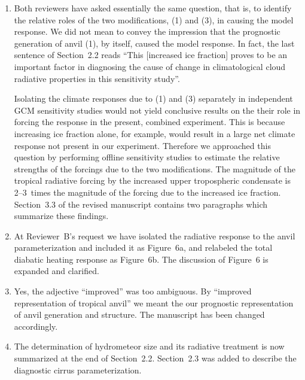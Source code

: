 \documentclass[12pt,twoside]{article}
\begin{document}
\begin{enumerate}

\item Both reviewers have asked essentially the same question, that
is, to identify the relative roles of the two modifications, (1) and
(3), in causing the model response.
We did not mean to convey the impression that the prognostic
generation of anvil (1), by itself, caused the model response.
In fact, the last sentence of Section~2.2 reads ``This [increased ice
fraction] proves to be an important factor in diagnosing the cause of
change in climatological cloud radiative properties in this
sensitivity study''.

Isolating the climate responses due to (1) and (3) separately in 
independent GCM sensitivity studies would not yield conclusive
results on the their role in forcing the response in the present,
combined experiment. 
This is because increasing ice fraction alone, for example, would
result in a large net climate response not present in our experiment.
Therefore we approached this question by performing offline
sensitivity studies to estimate the relative strengths of the
forcings due to the two modifications. 
The magnitude of the tropical radiative forcing by the increased upper
tropospheric condensate is 2--3~times the magnitude of the forcing due
to the increased ice fraction. 
Section~3.3 of the revised manuscript contains two paragraphs which 
summarize these findings.

\item At Reviewer~B's request we have isolated the radiative
response to the anvil parameterization and included it as Figure~6a,
and relabeled the total diabatic heating response as Figure~6b. 
The discussion of Figure~6 is expanded and clarified.

\item Yes, the adjective ``improved'' was too ambiguous.
By ``improved representation of tropical anvil'' we meant the
our prognostic representation of anvil generation and structure.
The manuscript has been changed accordingly.

\item The determination of hydrometeor size and its radiative
treatment is now summarized at the end of Section~2.2.
Section~2.3 was added to describe the diagnostic cirrus
parameterization. 

\end{enumerate}
\end{document}
